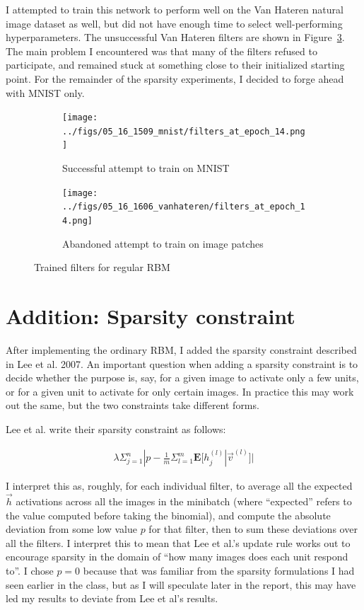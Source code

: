 \documentclass[12pt]{article}
\begin{document}
I attempted to train this network to perform well on the Van Hateren natural image dataset as well, but did not have enough time to select well-performing hyperparameters. The unsuccessful Van Hateren filters are shown in Figure~\ref{vanh1}. The main problem I encountered was that many of the filters refused to participate, and remained stuck at something close to their initialized starting point. For the remainder of the sparsity experiments, I decided to forge ahead with MNIST only.

\begin{figure}[h]
  \centering
  \begin{subfigure}{0.45\textwidth}
\texttt{[image: ../figs/05\_16\_1509\_mnist/filters\_at\_epoch\_14.png]}
  \caption{Successful attempt to train on MNIST}
  \label{mnist1}
  \end{subfigure}
  \begin{subfigure}{0.45\textwidth}
\texttt{[image: ../figs/05\_16\_1606\_vanhateren/filters\_at\_epoch\_14.png]}
  \caption{Abandoned attempt to train on image patches}
  \label{vanh1}
  \end{subfigure}
  \caption{Trained filters for regular RBM}
\end{figure}

\section*{Addition: Sparsity constraint}

After implementing the ordinary RBM, I added the sparsity constraint described in Lee et al. 2007. An important question when adding a sparsity constraint is to decide whether the purpose is, say, for a given image to activate only a few units, or for a given unit to activate for only certain images. In practice this may work out the same, but the two constraints take different forms. 

Lee et al. write their sparsity constraint as follows:

\begin{align*}
\lambda \Sigma_{j=1}^n |p - \frac{1}{m} \Sigma_{l=1}^m \mathbf{E} [h_j^{(l)} | \vec{v}^{(l)}] |
\end{align*}

I interpret this as, roughly, for each individual filter, to average all the expected $\vec{h}$ activations across all the images in the minibatch (where ``expected'' refers to the value computed before taking the binomial), and compute the absolute deviation from some low value $p$ for that filter, then to sum these deviations over all the filters. I interpret this to mean that Lee et al.'s update rule works out to encourage sparsity in the domain of ``how many images does each unit respond to''.  I chose $p=0$ because that was familiar from the sparsity formulations I had seen earlier in the class, but as I will speculate later in the report, this may have led my results to deviate from Lee et al's results.
\end{document}
